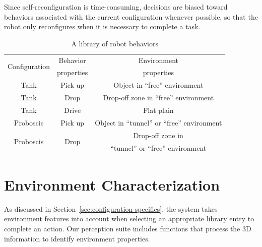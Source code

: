 \documentclass[conference]{IEEEtran}
\begin{document}
Since self-reconfiguration is time-consuming, decisions are biased toward behaviors associated with the current configuration whenever possible, so that the robot only reconfigures when it is necessary to complete a task.
%
\begin{table}
\centering
\begin{tabular}{ |c|c|c| } 
 \hline
 \multirow{2}{6em}{Configuration} & Behavior & Environment \\
 & properties & properties \\
 \hline
 Tank & Pick up & Object in ``free'' environment \\\hline
 Tank & Drop & Drop-off zone in ``free'' environment \\\hline
 Tank & Drive & Flat plain\\ \hline
 Proboscis & Pick up & Object in ``tunnel'' or ``free'' environment \\ \hline
 \multirow{2}{4em}{Proboscis} & \multirow{2}{2em}{Drop} & Drop-off zone in \\
 & & ``tunnel'' or ``free'' environment \\ 
 \hline
\end{tabular}
\caption{A library of robot behaviors}
\label{table:1}
\end{table}

%
%

\section{Environment Characterization}
\label{sec:environment-characterization}
%
As discussed in Section~\ref{sec:configuration-specifics}, the system takes environment features into account when selecting an appropriate library entry to complete an action. Our perception suite includes functions that process the 3D information to identify environment properties.

\end{document}

